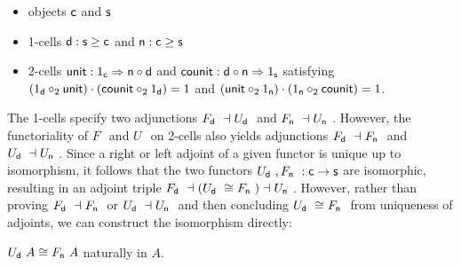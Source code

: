 \documentclass{drl-common/llncs}
\newcommand{\la}{\ensuremath{\dashv}}
\newcommand{\tc}[2]{\ensuremath{#1 \Rightarrow #2}}
\newcommand\compo[2]{\ensuremath{#1 \circ #2}}
\newcommand\compv[2]{\ensuremath{#1 \cdot #2}}
\newcommand\comph[2]{\ensuremath{#1 \mathbin{\circ_2} #2}}
\newcommand\F[2]{\ensuremath{F_{#1} \,\, #2}}
\newcommand\U[2]{\ensuremath{U_{#1} \,\, #2}}
\begin{document}
\begin{itemize}
\item objects $\mathsf{c}$ and $\mathsf{s}$
\item 1-cells $\mathsf{d} : \mathsf{s} \ge \mathsf{c}$ and $\mathsf{n} : \mathsf{c} \ge
  \mathsf{s}$
\item 2-cells $\dsd{unit} : \tc {1_{\dsd c}} {\compo{\dsd{n}} {\dsd{d}}}$ 
and $\dsd{counit} : \tc {\compo{\dsd{d}} {\dsd{n}}} {1_{\dsd s}}$ satisfying \\
$\compv{(\comph{1_{\dsd{d}}}{\dsd{unit}})}{(\comph{\dsd{counit}}{1_{\dsd d}})} = 1$
and 
$\compv{(\comph{\dsd{unit}}{1_{\dsd{n}}})}{(\comph{1_{\dsd n}}{\dsd{counit}})} = 1$.
\end{itemize}
\noindent
The 1-cells specify two adjunctions $\F{\dsd d}{} \la \U{\dsd d}{}$ and
$\F{\dsd n}{} \la \U{\dsd n}{}$.  However, the functoriality of $\F{}{}$
and $\U{}{}$ on 2-cells also yields adjunctions $\F{\dsd d}{} \la
\F{\dsd n}{}$ and $\U{\dsd d}{} \la \U{\dsd n}{}$.  Since a right or
left adjoint of a given functor is unique up to isomorphism, it follows
that the two functors $\U{\dsd d}{},\F{\dsd n}{} : \dsd c \to \dsd s$
are isomorphic, resulting in an adjoint triple $\F{\dsd d}{} \la (\U{\dsd
  d}{} \iso \F{\dsd{n}}{}) \la \U{\dsd{n}}{}$.  However, rather than
proving $\F{\dsd d}{} \la \F{\dsd n}{}$ or $\U{\dsd d}{} \la \U{\dsd
  n}{}$ and then concluding $\U{\dsd d}{} \iso \F{\dsd n}{}$ from
uniqueness of adjoints, we can construct the isomorphism directly:

\begin{lemma} \label{lem:mergeFU}
$\U{\dsd d}{A} \iso \F{\dsd n}{A}$ naturally in $A$.
\end{lemma}
\end{document}
